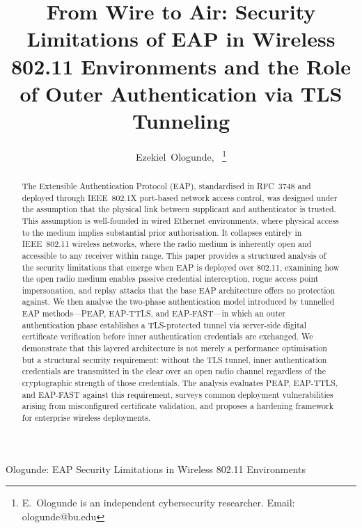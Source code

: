 \documentclass[journal]{IEEEtran}
\begin{document}
\title{From Wire to Air: Security Limitations of EAP in Wireless 802.11 Environments and the Role of Outer Authentication via TLS Tunneling}

\author{Ezekiel~Ologunde,~
\thanks{E.\ Ologunde is an independent cybersecurity researcher. Email: ologunde@bu.edu}}

%
{Ologunde: EAP Security Limitations in Wireless 802.11 Environments}

\maketitle

\begin{abstract}
The Extensible Authentication Protocol (EAP), standardised in RFC~3748 and deployed
through IEEE~802.1X port-based network access control, was designed under the
assumption that the physical link between supplicant and authenticator is trusted.
This assumption is well-founded in wired Ethernet environments, where physical access
to the medium implies substantial prior authorisation. It collapses entirely in
IEEE~802.11 wireless networks, where the radio medium is inherently open and
accessible to any receiver within range. This paper provides a structured analysis of
the security limitations that emerge when EAP is deployed over 802.11, examining how
the open radio medium enables passive credential interception, rogue access point
impersonation, and replay attacks that the base EAP architecture offers no protection
against. We then analyse the two-phase authentication model introduced by tunnelled
EAP methods---PEAP, EAP-TTLS, and EAP-FAST---in which an outer authentication phase
establishes a TLS-protected tunnel via server-side digital certificate verification
before inner authentication credentials are exchanged. We demonstrate that this
layered architecture is not merely a performance optimisation but a structural
security requirement: without the TLS tunnel, inner authentication credentials are
transmitted in the clear over an open radio channel regardless of the cryptographic
strength of those credentials. The analysis evaluates PEAP, EAP-TTLS, and EAP-FAST
against this requirement, surveys common deployment vulnerabilities arising from
misconfigured certificate validation, and proposes a hardening framework for
enterprise wireless deployments.
\end{abstract}
\end{document}
